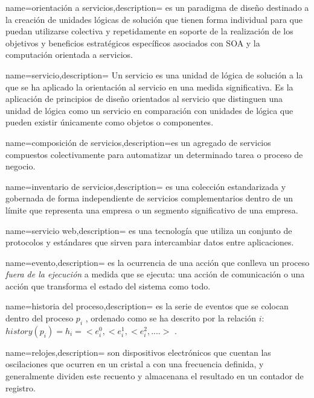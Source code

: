 {name={orientación a servicios},description= { es un paradigma de diseño destinado a la creación de unidades lógicas de solución que tienen forma individual para que puedan utilizarse colectiva y repetidamente en	soporte de la realización de los objetivos y beneficios estratégicos específicos asociados con SOA y la computación orientada a servicios.}}

{name={servicio},description= {Un servicio es una unidad de lógica de solución a la que se ha aplicado la orientación al servicio en una medida significativa.  Es  la aplicación de principios de diseño orientados al servicio que distinguen una unidad de lógica como un servicio en comparación con unidades de lógica que pueden existir únicamente 	como objetos o componentes.}}

{name={composición de servicios},description={es un agregado de servicios compuestos colectivamente para automatizar un determinado
tarea o proceso de negocio. }}

{name={inventario de servicios},description= {  es una colección estandarizada y gobernada de forma independiente de servicios complementarios dentro de un límite que representa una empresa o un segmento significativo de una empresa.}}

{name={servicio web},description= { es una tecnología que utiliza un conjunto de protocolos y estándares que sirven para intercambiar datos entre aplicaciones.}}

{name={evento},description= { es la ocurrencia de una  acción que conlleva un proceso \textit{fuera de la ejecuci\'on}  a medida que se ejecuta: una acción de comunicación o una acción que transforma el estado del sistema como todo.}}

{name={historia del proceso},description= {  es la serie de eventos que se colocan dentro del proceso $p_{i}$ , ordenado como se ha descrito por la relación ${i}:$ \\  $history(p_{i})  = h_{i}  = <e_{i}^{0},  <e_{i}^{1},  <e_{i}^{2}, ....>  $ .}}

{name={relojes},description= {son dispositivos electrónicos que cuentan las oscilaciones que ocurren en un cristal a con una frecuencia definida, y generalmente dividen este recuento y almacenana el resultado en un contador de registro.}}


